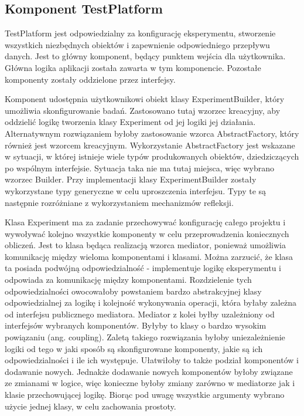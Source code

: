 \documentclass[12pt]{article}
\begin{document}
\subsection{Komponent TestPlatform}

TestPlatform jest odpowiedzialny za konfigurację eksperymentu, stworzenie wszystkich niezbędnych obiektów i zapewnienie odpowiedniego przepływu danych. Jest to główny komponent, będący punktem wejścia dla użytkownika. Główna logika aplikacji została zawarta w tym komponencie. Pozostałe komponenty zostały oddzielone przez interfejsy. 

Komponent udostępnia użytkownikowi obiekt klasy ExperimentBuilder, który umożliwia skonfigurowanie badań. Zastosowano tutaj wzorzec kreacyjny, aby oddzielić logikę tworzenia klasy Experiment od jej logiki jej działania. Alternatywnym rozwiązaniem byłoby zastosowanie wzorca AbstractFactory, który również jest wzorcem kreacyjnym. Wykorzystanie AbstractFactory jest wskazane w sytuacji, w której istnieje wiele typów produkowanych obiektów, dziedziczących po wspólnym interfejsie. Sytuacja taka nie ma tutaj miejsca, więc wybrano wzorzec Builder. Przy implementacji klasy ExperimentBuilder zostały wykorzystane typy generyczne w celu uproszczenia interfejsu. Typy te są następnie rozróżniane z wykorzystaniem mechanizmów refleksji.

Klasa Experiment ma za zadanie przechowywać konfigurację całego projektu i wywoływać kolejno wszystkie komponenty w celu przeprowadzenia koniecznych obliczeń. Jest to klasa będąca realizacją wzorca mediator, ponieważ umożliwia komunikację między wieloma komponentami i klasami. Można zarzucić, że klasa ta posiada podwójną odpowiedzialność - implementuje logikę eksperymentu i odpowiada za komunikację między komponentami. Rozdzielenie tych odpowiedzialności owocowałoby powstaniem bardzo abstrakcyjnej klasy odpowiedzialnej za logikę i kolejność wykonywania operacji, która byłaby zależna od interfejsu publicznego mediatora. Mediator z kolei byłby uzależniony od interfejsów wybranych komponentów. Byłyby to klasy o bardzo wysokim powiązaniu (ang. coupling). Zaletą takiego rozwiązania byłoby uniezależnienie logiki od tego w jaki sposób są skonfigurowane komponenty, jakie są ich odpowiedzialności i ile ich występuje. Ułatwiłoby to także podział komponentów i dodawanie nowych. Jednakże dodawanie nowych komponentów byłoby związane ze zmianami w logice, więc konieczne byłoby zmiany zarówno w mediatorze jak i klasie przechowującej logikę. Biorąc pod uwagę wszystkie argumenty wybrano użycie jednej klasy, w celu zachowania prostoty.
\end{document}

